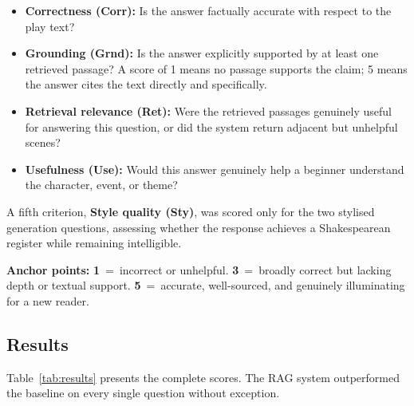 \documentclass[10pt,conference]{IEEEtran}
\begin{document}
\begin{itemize}
  \item \textbf{Correctness (Corr):} Is the answer factually accurate
        with respect to the play text?
  \item \textbf{Grounding (Grnd):} Is the answer explicitly supported
        by at least one retrieved passage? A score of 1 means no
        passage supports the claim; 5 means the answer cites the text
        directly and specifically.
  \item \textbf{Retrieval relevance (Ret):} Were the retrieved
        passages genuinely useful for answering this question, or did
        the system return adjacent but unhelpful scenes?
  \item \textbf{Usefulness (Use):} Would this answer genuinely help a
        beginner understand the character, event, or theme?
\end{itemize}

A fifth criterion, \textbf{Style quality (Sty)}, was scored only for
the two stylised generation questions, assessing whether the response
achieves a Shakespearean register while remaining intelligible.

\vspace{4pt}
\begin{mdframed}[style=callout]
\small\noindent\textbf{Anchor points:}\enspace
\textbf{1}~=~incorrect or unhelpful.\enspace
\textbf{3}~=~broadly correct but lacking depth or textual support.\enspace
\textbf{5}~=~accurate, well-sourced, and genuinely illuminating
for a new reader.
\end{mdframed}

\subsection{Results}

\vspace{4pt}
\noindent Table~\ref{tab:results} presents the complete scores. The
RAG system outperformed the baseline on every single question without
exception.
\end{document}
